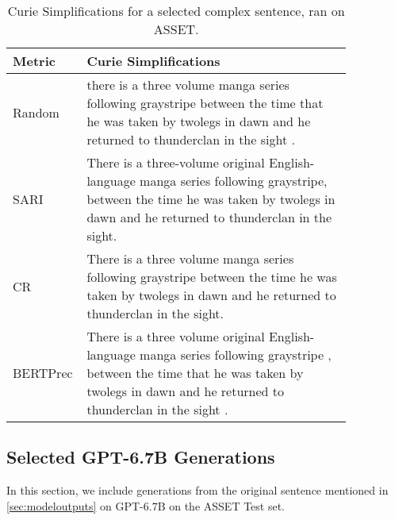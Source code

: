 \documentclass[11pt]{article}
\begin{document}
\begin{table*}[htbp]
         \centering
            \small
             \renewcommand{\arraystretch}{1.5}
        \begin{tabular}{p{0.1\linewidth} p{0.75\linewidth}} \toprule
        Metric   & Curie Simplifications \\   \midrule                                                                                                     
        Random   &  there is a three volume manga series following graystripe between the time that he was taken by twolegs in dawn and he returned to thunderclan in the sight .\\
        \midrule
        SARI   &  There is a three-volume original English-language manga series following graystripe, between the time he was taken by twolegs in dawn and he returned to thunderclan in the sight.\\
        \midrule
        CR   &  There is a three volume manga series following graystripe between the time he was taken by twolegs in dawn and he returned to thunderclan in the sight.\\
        \midrule
        BERTPrec   &  There is a three volume original English-language manga series following graystripe , between the time that he was taken by twolegs in dawn and he returned to thunderclan in the sight .\\ 
        \bottomrule
        \end{tabular}
        \caption{Curie Simplifications for a selected complex sentence, ran on ASSET.} 
         \label{tab:curie}
    \end{table*}

\subsection{Selected GPT-6.7B Generations}
\label{ssec:babbageasset}
In this section, we include generations from the original sentence mentioned in \ref{sec:modeloutputs} on GPT-$6.7$B on the ASSET Test set.
\end{document}
